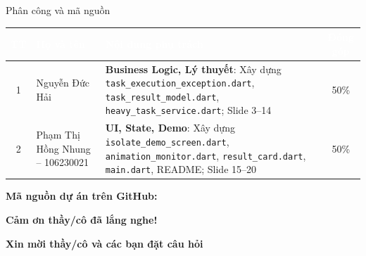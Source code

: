 \documentclass[aspectratio=169,11pt]{beamer}
\begin{document}
\begin{frame}{Phân công và mã nguồn}
  \begin{table}
    \scriptsize
    \centering
    \begin{tabular}{c p{2.8cm} >{\raggedright\arraybackslash}p{6.8cm} c}
      \toprule
      \rowcolor{navyD}
      \textcolor{white}{\textbf{TT}} & \textcolor{white}{\textbf{Họ và tên}} & \textcolor{white}{\textbf{Nội dung phụ trách}} & \textcolor{white}{\textbf{Đóng góp}} \\
      \midrule
      \rowcolor{grayL!50}
      1 & Nguyễn Đức Hải & \textbf{Business Logic, Lý thuyết}: Xây dựng \texttt{task\_execution\_exception.dart}, \texttt{task\_result\_model.dart}, \texttt{heavy\_task\_service.dart}; Slide 3--14 & 50\% \\
      2 & Phạm Thị Hồng Nhung -- 106230021 & \textbf{UI, State, Demo}: Xây dựng \texttt{isolate\_demo\_screen.dart}, \texttt{animation\_monitor.dart}, \texttt{result\_card.dart}, \texttt{main.dart}, README; Slide 15--20 & 50\% \\
      \bottomrule
    \end{tabular}
  \end{table}

  \vspace{0.35cm}
  \begin{center}
    \textbf{Mã nguồn dự án trên GitHub:}\\
    \vspace{0.1cm}
  \end{center}
\end{frame}

\begin{frame}
  \vfill
  \begin{center}
    {\huge\bfseries Cảm ơn thầy/cô đã lắng nghe!\par}
    \vspace{0.6cm}
    {\Large\color{purpD}\bfseries Xin mời thầy/cô và các bạn đặt câu hỏi\par}
  \end{center}
  \vfill
\end{frame}
\end{document}
